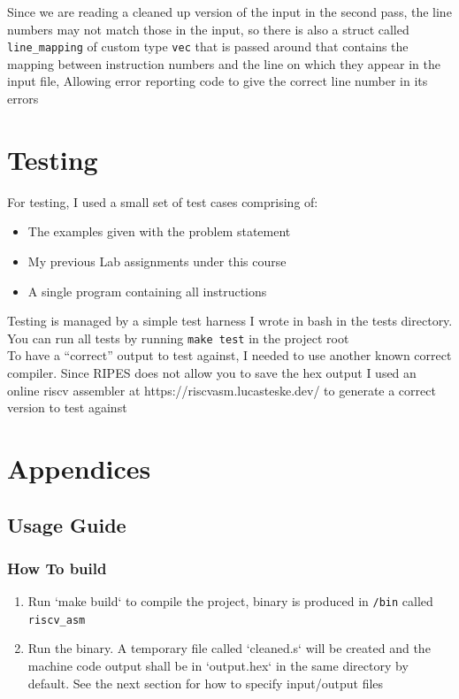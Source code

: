 \documentclass[12pt]{article}
\begin{document}
    Since we are reading a cleaned up version of the input in the second pass, the line numbers may not match those in the input, so there is also a struct called \verb|line_mapping| of custom type \verb|vec| that is passed around that contains the mapping between instruction numbers and the line on which they appear in the input file, Allowing error reporting code to give the correct line number in its errors

    \section{Testing}
    For testing, I used a small set of test cases comprising of:
    
	\begin{itemize}
		\item{The examples given with the problem statement}
		\item{My previous Lab assignments under this course}
		\item{A single program containing all instructions}
	\end{itemize}
	
 Testing is managed by a simple test harness I wrote in bash in the tests directory. You can run all tests by running \verb|make test| in the project root\\
	To have a ``correct'' output to test against, I needed to use another known correct compiler. Since RIPES does not allow you to save the hex output I used an online riscv assembler at https://riscvasm.lucasteske.dev/ to generate a correct version to test against

    \newpage
    \appendix
    \section*{Appendices}
    \renewcommand{\thesubsection}{\Alph{subsection}}
    
    \subsection{Usage Guide}

    \subsubsection*{How To build}
    \begin{enumerate}
        \item Run `make build` to compile the project, binary is produced in \verb#/bin# called \verb#riscv_asm#
        \item Run the binary. A temporary file called `cleaned.s` will be created and the machine code output shall be in `output.hex` in the same directory by default. 
    See the next section for how to specify input/output files
    \end{enumerate}
    
\end{document}
